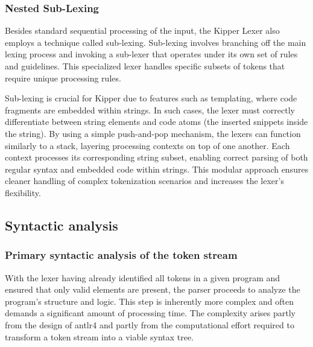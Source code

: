 \subsubsection{Nested Sub-Lexing}
\label{sec:nested-sub-lexing}

Besides standard sequential processing of the input, the Kipper Lexer also employs a technique called sub-lexing. Sub-lexing involves branching off the main lexing process and invoking a sub-lexer that operates under its own set of rules and guidelines. This specialized lexer handles specific subsets of tokens that require unique processing rules.

Sub-lexing is crucial for Kipper due to features such as templating, where code fragments are embedded within strings. In such cases, the lexer must correctly differentiate between string elements and code atoms (the inserted snippets inside the string). By using a simple push-and-pop mechanism, the lexers can function similarly to a stack, layering processing contexts on top of one another. Each context processes its corresponding string subset, enabling correct parsing of both regular syntax and embedded code within strings. This modular approach ensures cleaner handling of complex tokenization scenarios and increases the lexer's flexibility.


\subsection{Syntactic analysis}

\subsubsection{Primary syntactic analysis of the token stream}

With the lexer having already identified all tokens in a given program and ensured that only valid elements are present, the parser proceeds to analyze the program's structure and logic. This step is inherently more complex and often demands a significant amount of processing time. The complexity arises partly from the design of \Gls{antlr4} and partly from the computational effort required to transform a token stream into a viable syntax tree.

